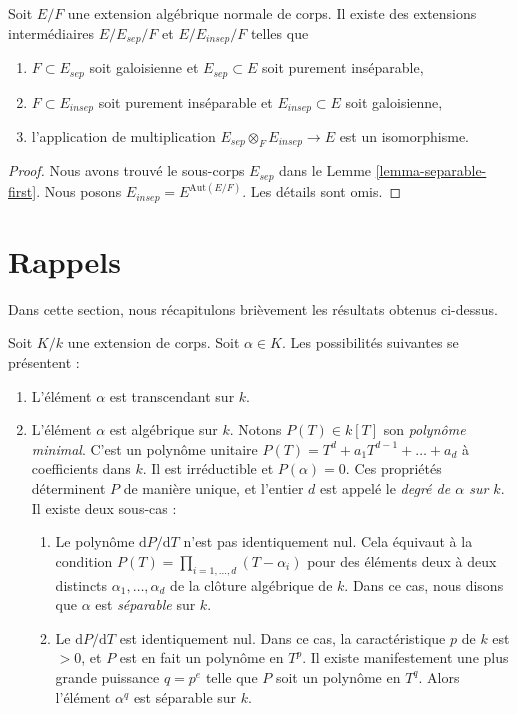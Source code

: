 \begin{lemma}
\label{lemma-normal-case}
Soit $E/F$ une extension algébrique normale de corps. Il existe des extensions intermédiaires
$E / E_{sep} /F$ et $E / E_{insep} / F$ telles que
\begin{enumerate}
\item $F \subset E_{sep}$ soit galoisienne et $E_{sep} \subset E$
soit purement inséparable,
\item $F \subset E_{insep}$ soit purement inséparable et $E_{insep} \subset E$
soit galoisienne,
\item l'application de multiplication $E_{sep} \otimes_F E_{insep} \longrightarrow E$
est un isomorphisme.
\end{enumerate}
\end{lemma}

\begin{proof}
Nous avons trouvé le sous-corps $E_{sep}$ dans le Lemme \ref{lemma-separable-first}.
Nous posons $E_{insep} = E^{\text{Aut}(E/F)}$. Les détails sont omis.
\end{proof}









\section{Rappels}
\label{section-algebraic}

\noindent
Dans cette section, nous récapitulons brièvement les résultats obtenus ci-dessus.

\medskip\noindent
Soit $K/k$ une extension de corps. Soit $\alpha \in K$. Les
possibilités suivantes se présentent :
\begin{enumerate}
\item L'élément $\alpha$ est transcendant sur $k$.
\item L'élément $\alpha$ est algébrique sur $k$. Notons
$P(T) \in k[T]$ son {\it polynôme minimal}. C'est un polynôme unitaire
$P(T) = T^d + a_1 T^{d - 1} + \ldots + a_d$ à coefficients dans
$k$. Il est irréductible et $P(\alpha) = 0$. Ces propriétés
déterminent $P$ de manière unique, et l'entier $d$ est appelé le
{\it degré de $\alpha$ sur $k$}. Il existe deux sous-cas :
\begin{enumerate}
\item Le polynôme $\text{d}P/\text{d}T$ n'est pas identiquement nul.
Cela équivaut à la condition
$P(T) = \prod_{i = 1, \ldots, d} (T - \alpha_i)$ pour des
éléments deux à deux distincts $\alpha_1, \ldots, \alpha_d$
de la clôture algébrique de $k$.
Dans ce cas, nous disons que $\alpha$ est {\it séparable} sur $k$.
\item Le $\text{d}P/\text{d}T$ est identiquement nul. Dans ce cas, la
caractéristique $p$ de $k$ est $ > 0$, et $P$ est en fait un polynôme
en $T^p$. Il existe manifestement une plus grande puissance $q = p^e$ telle que $P$ soit
un polynôme en $T^q$. Alors l'élément $\alpha^q$ est séparable sur $k$.
\end{enumerate}
\end{enumerate}

